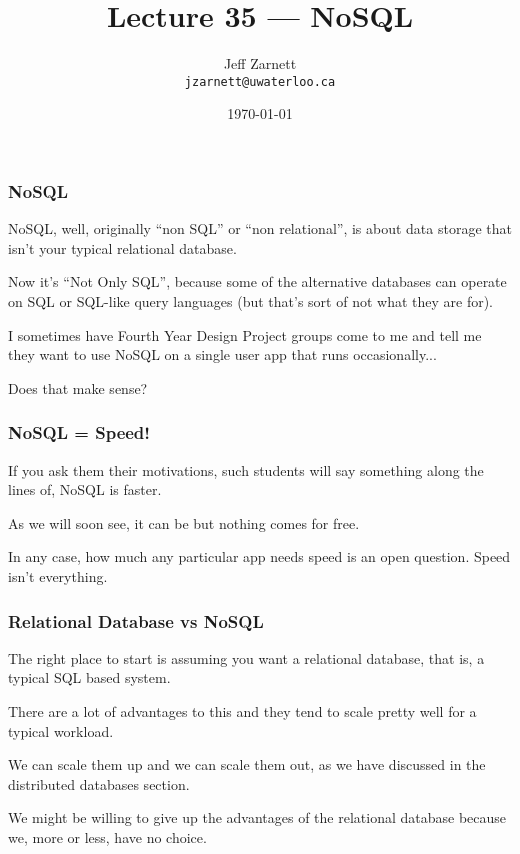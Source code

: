 

\title{Lecture 35 --- NoSQL }

\author{Jeff Zarnett \\ \small \texttt{jzarnett@uwaterloo.ca}}
\date{\today}




\begin{frame}
  \titlepage

 \end{frame}



\begin{frame}
\frametitle{NoSQL}

NoSQL, well, originally ``non SQL'' or ``non relational'', is about data storage that isn't your typical relational database. 

Now it's ``Not Only SQL'', because some of the alternative databases can operate on SQL or SQL-like query languages (but that's sort of not what they are for). 

I sometimes have Fourth Year Design Project groups come to me and tell me they want to use NoSQL on a single user app that runs occasionally... 

Does that make sense?


\end{frame}



\begin{frame}
\frametitle{NoSQL = Speed!}

If you ask them their motivations, such students will say something along the lines of, NoSQL is faster. 

As we will soon see, it can be but nothing comes for free. 

In any case, how much any particular app needs speed is an open question. Speed isn't everything. 


\end{frame}


\begin{frame}
\frametitle{Relational Database vs NoSQL}

The right place to start is assuming you want a relational database, that is, a typical SQL based system. 

There are a lot of advantages to this and they tend to scale pretty well for a typical workload. 

We can scale them up and we can scale them out, as we have discussed in the distributed databases section. 

We might be willing to give up the advantages of the relational database because we, more or less, have no choice.


\end{frame}



